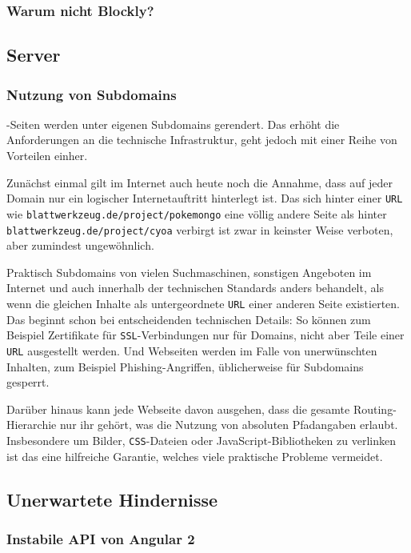 \subsubsection{Warum nicht Blockly?}

\subsection{Server}

\subsubsection{Nutzung von Subdomains}

\idename{}-Seiten werden unter eigenen Subdomains gerendert. Das erhöht die Anforderungen an die technische Infrastruktur, geht jedoch mit einer Reihe von Vorteilen einher.

Zunächst einmal gilt im Internet auch heute noch die Annahme, dass auf jeder Domain nur ein logischer Internetauftritt hinterlegt ist. Das sich hinter einer \texttt{URL} wie \texttt{blatt\-werk\-zeug.de\-/project\-/pokemongo} eine völlig andere Seite als hinter \texttt{blatt\-werk\-zeug.de\-/project\-/cyoa} verbirgt ist zwar in keinster Weise verboten, aber zumindest ungewöhnlich.

Praktisch Subdomains von vielen Suchmaschinen, sonstigen Angeboten im Internet und auch innerhalb der technischen Standards anders behandelt, als wenn die gleichen Inhalte als untergeordnete \texttt{URL} einer anderen Seite existierten. Das beginnt schon bei entscheidenden technischen Details: So können zum Beispiel Zertifikate für \texttt{SSL}-Verbindungen nur für Domains, nicht aber Teile einer \texttt{URL} ausgestellt werden. Und Webseiten werden im Falle von unerwünschten Inhalten, zum Beispiel Phishing-Angriffen, üblicherweise für Subdomains gesperrt.

Darüber hinaus kann jede Webseite davon ausgehen, dass die gesamte Routing-Hierarchie nur ihr gehört, was die Nutzung von absoluten Pfadangaben erlaubt. Insbesondere um Bilder, \texttt{CSS}-Dateien oder JavaScript-Bibliotheken zu verlinken ist das eine hilfreiche Garantie, welches viele praktische Probleme vermeidet.

\subsection{Unerwartete Hindernisse}

\subsubsection{Instabile API von Angular 2}


